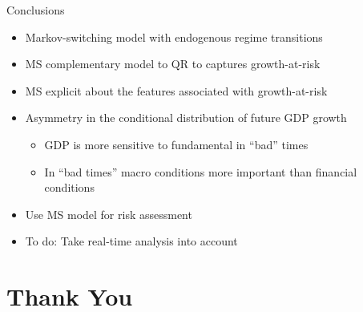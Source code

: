 \documentclass[xcolor=dvipsnames, xcolor=table, 10pt]{beamer}
\begin{document}

\begin{frame}{Conclusions}
\begin{itemize}
\medskip
\item Markov-switching model with endogenous regime transitions
\medskip
\item MS complementary model to QR to captures growth-at-risk
\medskip
\item MS explicit about the features associated with growth-at-risk
\medskip
\item Asymmetry in the conditional distribution of future GDP growth
\begin{itemize}
\medskip
\item GDP is more sensitive to fundamental in ``bad'' times
\medskip
\item In ``bad times'' macro conditions more important than financial conditions
\end{itemize}
\medskip
\item Use MS model for risk assessment
\medskip
\item To do: Take real-time analysis into account
\end{itemize}
\end{frame}


\section{Thank You}
\begin{frame}[noframenumbering]
\thispagestyle{empty}
       \begin{center}
         \structure{\Huge {\color{black}{\insertsection}}}
       \end{center}
   \end{frame}


\appendix


\setcounter{framenumber}{0}
\renewcommand{\insertframenumber}{A-\arabic{framenumber}}
\renewcommand{\theframenumber}{A-\arabic{framenumber}}

\end{document}
